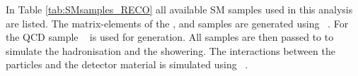 In Table \ref{tab:SMsamples_RECO} all available SM samples used in this analysis are listed.
The matrix-elements of the \WJets, \ttbarJets and \ZlepJets samples are generated using ~\cite{bib:Madgraph_2014}. 
For the QCD sample \pythiaSix~\cite{bib:Pyhtia6_2006} is used for generation.
All samples are then passed to  to simulate the hadronisation and the showering. %
The interactions between the particles and the detector material is simulated using \geant~\cite{bib:Geant4_2003,bib:Geant4_2006}.


